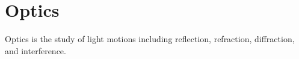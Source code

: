 \chapter{Optics}
\thispagestyle{fancy}

Optics is the study of light motions including reflection, refraction, diffraction, and interference. 
